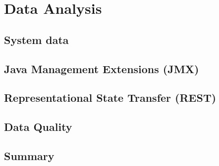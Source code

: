 \chapter{Data Analysis}

\section{System data}

\section{Java Management Extensions (JMX)}

\section{Representational State Transfer (REST)}

\section{Data Quality}

\section{Summary}
